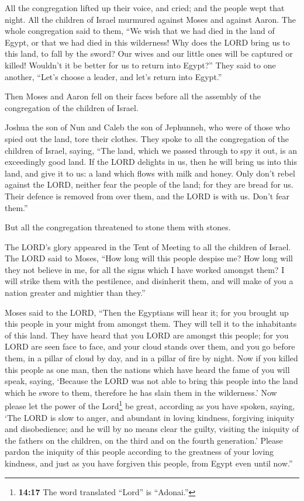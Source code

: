  All the congregation lifted up their voice, and cried;
and the people wept that night.  All the children of
Israel murmured against Moses and against Aaron. The whole congregation
said to them, ``We wish that we had died in the land of Egypt, or that
we had died in this wilderness!  Why does the LORD bring
us to this land, to fall by the sword? Our wives and our little ones
will be captured or killed! Wouldn't it be better for us to return into
Egypt?''  They said to one another, ``Let's choose a
leader, and let's return into Egypt.''

 Then Moses and Aaron fell on their faces before all the
assembly of the congregation of the children of Israel.

 Joshua the son of Nun and Caleb the son of Jephunneh, who
were of those who spied out the land, tore their clothes. 
They spoke to all the congregation of the children of Israel, saying,
``The land, which we passed through to spy it out, is an exceedingly
good land.  If the LORD delights in us, then he will bring
us into this land, and give it to us: a land which flows with milk and
honey.  Only don't rebel against the LORD, neither fear
the people of the land; for they are bread for us. Their defence is
removed from over them, and the LORD is with us. Don't fear them.''

 But all the congregation threatened to stone them with
stones.

The LORD's glory appeared in the Tent of Meeting to all the children of
Israel.  The LORD said to Moses, ``How long will this
people despise me? How long will they not believe in me, for all the
signs which I have worked amongst them?  I will strike
them with the pestilence, and disinherit them, and will make of you a
nation greater and mightier than they.''

 Moses said to the LORD, ``Then the Egyptians will hear
it; for you brought up this people in your might from amongst them.
 They will tell it to the inhabitants of this land. They
have heard that you LORD are amongst this people; for you LORD are seen
face to face, and your cloud stands over them, and you go before them,
in a pillar of cloud by day, and in a pillar of fire by night.
 Now if you killed this people as one man, then the
nations which have heard the fame of you will speak, saying,
 `Because the LORD was not able to bring this people into
the land which he swore to them, therefore he has slain them in the
wilderness.'  Now please let the power of the
Lord\footnote{\textbf{14:17} The word translated ``Lord'' is ``Adonai.''}
be great, according as you have spoken, saying,  `The
LORD is slow to anger, and abundant in loving kindness, forgiving
iniquity and disobedience; and he will by no means clear the guilty,
visiting the iniquity of the fathers on the children, on the third and
on the fourth generation.'  Please pardon the iniquity of
this people according to the greatness of your loving kindness, and just
as you have forgiven this people, from Egypt even until now.''

